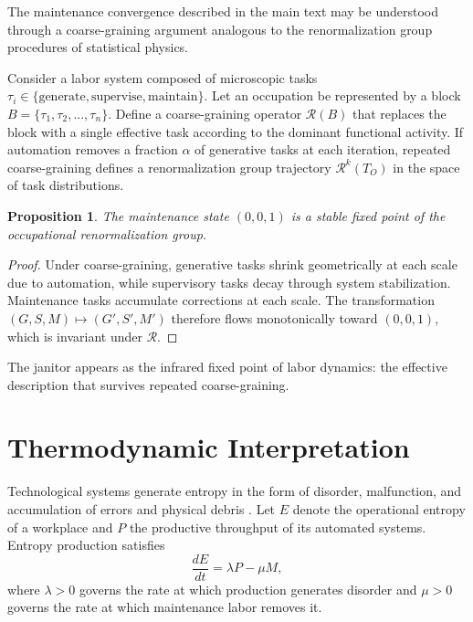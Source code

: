 \documentclass[12pt,a4paper]{article}
\theoremstyle{plain}
\newtheorem{proposition}[theorem]{Proposition}
\theoremstyle{definition}
\theoremstyle{remark}
\begin{document}
The maintenance convergence described in the main text may be understood
through a coarse-graining argument analogous to the renormalization group
procedures of statistical physics.

Consider a labor system composed of microscopic tasks
$\tau_i \in \{\text{generate}, \text{supervise}, \text{maintain}\}$.
Let an occupation be represented by a block $B = \{\tau_1,\tau_2,\ldots,\tau_n\}$.
Define a coarse-graining operator $\mathcal{R}(B)$ that replaces the block
with a single effective task according to the dominant functional activity.
If automation removes a fraction $\alpha$ of generative tasks at each
iteration, repeated coarse-graining defines a renormalization group trajectory
$\mathcal{R}^k(T_O)$ in the space of task distributions.

\begin{proposition}
The maintenance state $(0,0,1)$ is a stable fixed point of the occupational
renormalization group.
\end{proposition}

\begin{proof}
Under coarse-graining, generative tasks shrink geometrically at each scale
due to automation, while supervisory tasks decay through system stabilization.
Maintenance tasks accumulate corrections at each scale.  The transformation
$(G,S,M) \mapsto (G',S',M')$ therefore flows monotonically toward $(0,0,1)$,
which is invariant under $\mathcal{R}$.
\end{proof}

The janitor appears as the infrared fixed point of labor dynamics: the
effective description that survives repeated coarse-graining.

\section{Thermodynamic Interpretation}
\label{app:thermo}

Technological systems generate entropy in the form of disorder, malfunction,
and accumulation of errors and physical debris \cite{georgescuroegen1971}.  Let $E$ denote the
operational entropy of a workplace and $P$ the productive throughput of its
automated systems.  Entropy production satisfies
\[
\frac{dE}{dt} = \lambda P - \mu M,
\]
where $\lambda > 0$ governs the rate at which production generates disorder
and $\mu > 0$ governs the rate at which maintenance labor removes it.
\end{document}
